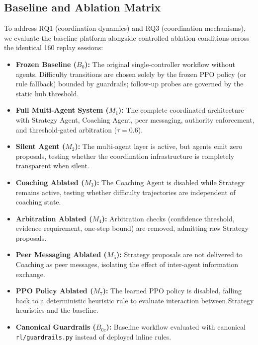 \subsection{Baseline and Ablation Matrix}
To address RQ1 (coordination dynamics) and RQ3 (coordination mechanisms), we evaluate the baseline platform alongside controlled ablation conditions across the identical 160 replay sessions:
\begin{itemize}
\item \textbf{Frozen Baseline ($B_0$):} The original single-controller workflow without agents. Difficulty transitions are chosen solely by the frozen PPO policy (or rule fallback) bounded by guardrails; follow-up probes are governed by the static hub threshold.
\item \textbf{Full Multi-Agent System ($M_1$):} The complete coordinated architecture with Strategy Agent, Coaching Agent, peer messaging, authority enforcement, and threshold-gated arbitration ($\tau = 0.6$).
\item \textbf{Silent Agent ($M_2$):} The multi-agent layer is active, but agents emit zero proposals, testing whether the coordination infrastructure is completely transparent when silent.
\item \textbf{Coaching Ablated ($M_3$):} The Coaching Agent is disabled while Strategy remains active, testing whether difficulty trajectories are independent of coaching state.
\item \textbf{Arbitration Ablated ($M_4$):} Arbitration checks (confidence threshold, evidence requirement, one-step bound) are removed, admitting raw Strategy proposals.
\item \textbf{Peer Messaging Ablated ($M_5$):} Strategy proposals are not delivered to Coaching as peer messages, isolating the effect of inter-agent information exchange.
\item \textbf{PPO Policy Ablated ($M_7$):} The learned PPO policy is disabled, falling back to a deterministic heuristic rule to evaluate interaction between Strategy heuristics and the baseline.
\item \textbf{Canonical Guardrails ($B_{0c}$):} Baseline workflow evaluated with canonical \texttt{rl/guardrails.py} instead of deployed inline rules.
\end{itemize}

